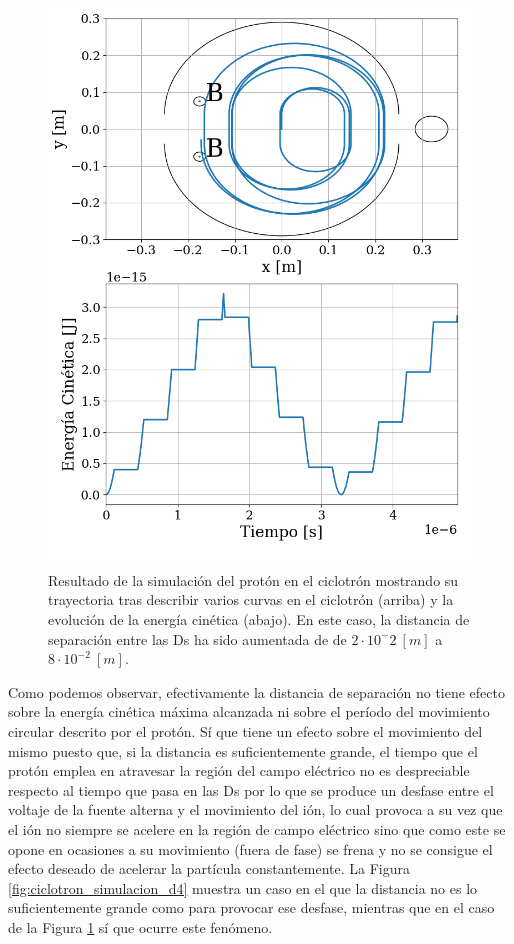 \documentclass[journal]{IEEEtran}
\begin{document}
\begin{figure}[!tb]
    \centering
    \includegraphics[width=0.9\linewidth]{ciclotron_simulacion_d8.png}
    \caption{Resultado de la simulación del protón en el ciclotrón mostrando su trayectoria tras describir varios curvas en el ciclotrón (arriba) y la evolución de la energía cinética (abajo). En este caso, la distancia de separación entre las Ds ha sido aumentada de de $2\cdot 10^-2~[m]$ a $8\cdot 10^{-2}~[m]$.}
    \label{fig:ciclotron_simulacion_d8}
\end{figure}

Como podemos observar, efectivamente la distancia de separación no tiene efecto sobre la energía cinética máxima alcanzada ni sobre el período del movimiento circular descrito por el protón. Sí que tiene un efecto sobre el movimiento del mismo puesto que, si la distancia es suficientemente grande, el tiempo que el protón emplea en atravesar la región del campo eléctrico no es despreciable respecto al tiempo que pasa en las Ds por lo que se produce un desfase entre el voltaje de la fuente alterna y el movimiento del ión, lo cual provoca a su vez que el ión no siempre se acelere en la región de campo eléctrico sino que como este se opone en ocasiones a su movimiento (fuera de fase) se frena y no se consigue el efecto deseado de acelerar la partícula constantemente. La Figura \ref{fig:ciclotron_simulacion_d4} muestra un caso en el que la distancia no es lo suficientemente grande como para provocar ese desfase, mientras que en el caso de la Figura \ref{fig:ciclotron_simulacion_d8} sí que ocurre este fenómeno.
\end{document}
